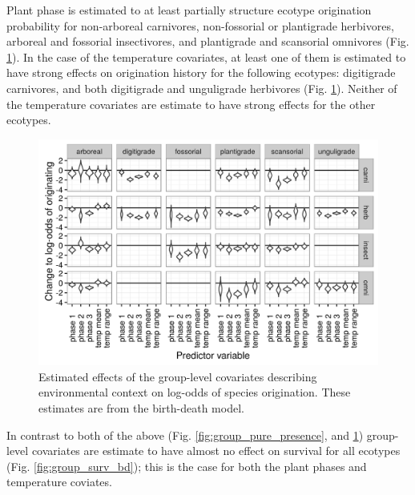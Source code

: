 \documentclass[12pt,letterpaper]{article}
\begin{document}
Plant phase is estimated to at least partially structure ecotype origination probability for non-arboreal carnivores, non-fossorial or plantigrade herbivores, arboreal and fossorial insectivores, and plantigrade and scansorial omnivores (Fig. \ref{fig:group_origin_bd}). 
In the case of the temperature covariates, at least one of them is estimated to have strong effects on origination history for the following ecotypes: digitigrade carnivores, and both digitigrade and unguligrade herbivores (Fig. \ref{fig:group_origin_bd}). Neither of the temperature covariates are estimate to have strong effects for the other ecotypes.

\begin{figure}[ht]
  \centering
  \includegraphics[width=\textwidth,height=0.5\textheight,keepaspectratio=true]{figure/group_on_origin_bd}
  \caption[Effects of group-level covariates on log-odds of ecotype origination as estimated from the the birth-death model]{Estimated effects of the group-level covariates describing environmental context on log-odds of species origination. These estimates are from the birth-death model.}
  \label{fig:group_origin_bd}
\end{figure}


In contrast to both of the above (Fig. \ref{fig:group_pure_presence}, and \ref{fig:group_origin_bd}) group-level covariates are estimate to have almost no effect on survival for all ecotypes (Fig. \ref{fig:group_surv_bd}); this is the case for both the plant phases and temperature coviates.
\end{document}
